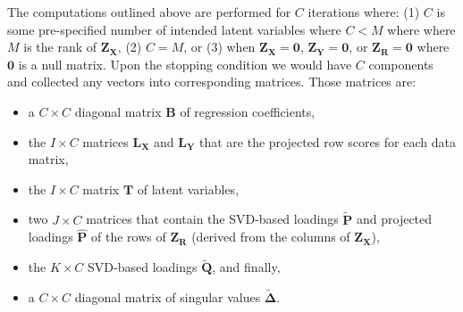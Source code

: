 \documentclass[12pt]{article}
\begin{document}
The computations outlined above are performed for \(C\) iterations
where: (1) \(C\) is some pre-specified number of intended latent
variables where \(C < M\) where where \(M\) is the rank of
\({\mathbf Z}_{\mathbf X}\), (2) \(C=M\), or (3) when
\({\mathbf Z}_{\mathbf X} = {\mathbf 0}\),
\({\mathbf Z}_{\mathbf Y} = {\mathbf 0}\), or
\({\mathbf Z}_{\mathbf R} = {\mathbf 0}\) where \({\mathbf 0}\) is a
null matrix. Upon the stopping condition we would have \(C\) components
and collected any vectors into corresponding matrices. Those matrices
are:

\begin{itemize}
\item
  a \(C \times C\) diagonal matrix \({\mathbf B}\) of regression
  coefficients,
\item
  the \(I \times C\) matrices \({\mathbf L}_{\mathbf X}\) and
  \({\mathbf L}_{\mathbf Y}\) that are the projected row scores for each
  data matrix,
\item
  the \(I \times C\) matrix \({\mathbf T}\) of latent variables,
\item
  two \(J \times C\) matrices that contain the SVD-based loadings
  \(\widetilde{\mathbf P}\) and projected loadings
  \(\widehat{\mathbf P}\) of the rows of \({\mathbf Z}_{\mathbf R}\)
  (derived from the columns of \({\mathbf Z}_{\mathbf X}\)),
\item
  the \(K \times C\) SVD-based loadings \(\widetilde{\mathbf Q}\), and
  finally,
\item
  a \(C \times C\) diagonal matrix of singular values
  \(\widetilde{\boldsymbol \Delta}\).
\end{itemize}
\end{document}
